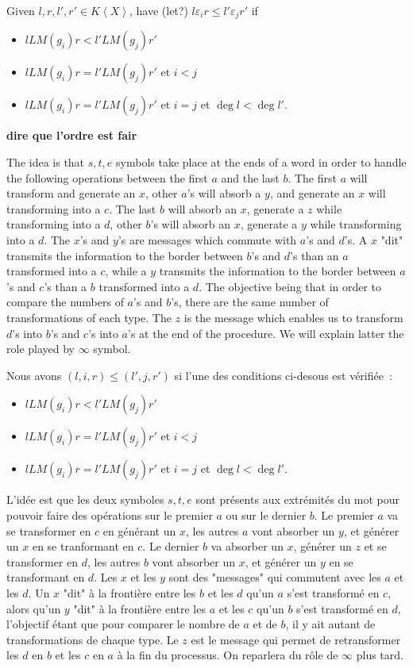 \documentclass[sigconf]{acmart}
\theoremstyle{plain}
\theoremstyle{definition}
\theoremstyle{remark}
\newcommand{\LM}{LM}
\newcommand\fixmecc[1]{{\color{red}{\underline{\bf C:}} #1}}
\newcommand{\KX}{K \left\langle X \right\rangle}
\begin{document}
\fixmecc{Given $l,r,l',r'\in\KX$, have (let?) $l\varepsilon_i r\leq l'\varepsilon_j r'$ if
  \begin{itemize}
  \item $l\LM(g_i)r < l'\LM(g_j)r'$
  \item $l\LM(g_i)r = l'\LM(g_j)r'$ et $i < j$
  \item $l\LM(g_i)r = l'\LM(g_j)r'$ et $i = j$ et $\deg{l} < \deg{l'}$.
  \end{itemize}
      {\bf dire que l'ordre est fair}
      
  The idea is that $s, t, e$ symbols take place at the ends of a word in order to handle the following operations between the first $a$ and the last $b$.
  The first $a$ will transform and generate an $x$, other $a$'s will absorb a $y$, and generate an $x$ will transforming into a $c$.
The last $b$ will absorb an $x$, generate a $z$ while transforming into a $d$, other $b$'s will absorb an $x$, generate a $y$ while transforming into a $d$.
The $x$'s and $y$'s are messages which commute with $a$'s and $d$'s. A $x$ "dit" transmits the information to the border between $b$'s and $d$'s than an $a$ transformed into a $c$, while a $y$ transmits the information to the border between $a$'s and $c$'s than a $b$ transformed into a $d$. The objective being that in order to compare the numbers of $a$'s and $b$'s, there are the same number of transformations of each type.
The $z$ is the message which enables us to transform $d$'s into $b$'s and $c$'s into $a$'s at the end of the procedure.
We will explain latter the role played by $\infty$ symbol.
}

{  Nous avons $(l, i, r) \leq (l', j, r')$ si l'une des conditions ci-desous est vérifiée~:
\begin{itemize}
	\item $l\LM(g_i)r < l'\LM(g_j)r'$
	\item $l\LM(g_i)r = l'\LM(g_j)r'$ et $i < j$
	\item $l\LM(g_i)r = l'\LM(g_j)r'$ et $i = j$ et $\deg{l} < \deg{l'}$.
\end{itemize}

L'idée est que les deux symboles $s, t, e$ sont présents aux extrémités du mot pour pouvoir faire des opérations sur le premier $a$ ou sur le dernier $b$.
Le premier $a$ va se transformer en $c$ en générant un $x$, les autres $a$ vont absorber un $y$, et générer un $x$ en se tranformant en $c$.
Le dernier $b$ va absorber un $x$, générer un $z$ et se transformer en $d$, les autres $b$ vont absorber un $x$, et générer un $y$ en se transformant en $d$.
Les $x$ et les $y$ sont des "messages" qui commutent avec les $a$ et les $d$. Un $x$ "dit" à la frontière entre les $b$ et les $d$ qu'un $a$ s'est transformé en $c$, alors qu'un $y$ "dit" à la frontière entre les $a$ et les $c$ qu'un $b$ s'est transformé en $d$, l'objectif étant que pour comparer le nombre de $a$ et de $b$, il y ait autant de transformations de chaque type.
Le $z$ est le message qui permet de retransformer les $d$ en $b$ et les $c$ en $a$ à la fin du processus. On reparlera du rôle de $\infty$ plus tard.
}
\end{document}
